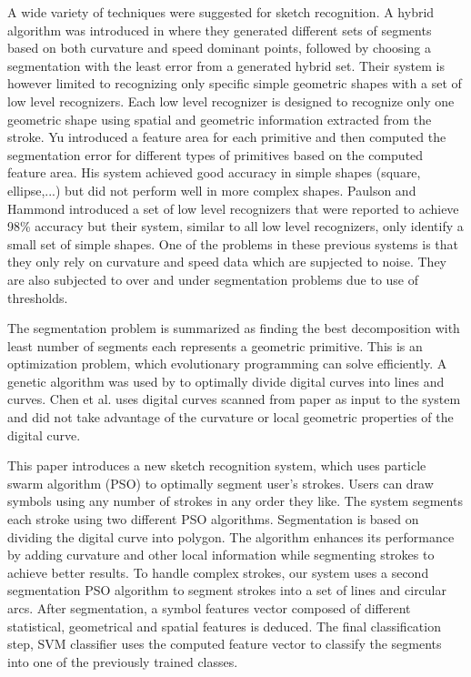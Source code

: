 \documentclass{article}
\begin{document}
A wide variety of techniques were suggested for sketch recognition.  A hybrid algorithm was introduced in \cite{earlyprocess} where they generated different sets of segments based on both curvature and speed dominant points, followed by choosing a segmentation with the least error from a generated hybrid set. Their system is however limited to recognizing only specific simple geometric shapes with a set of low level recognizers. Each low level recognizer is designed to recognize only one geometric shape using spatial and geometric information extracted from the stroke.  Yu \cite{meanshift10} introduced a feature area for each primitive and then computed the segmentation error for different types of primitives based on the computed feature area. His system achieved good accuracy in simple shapes (square, ellipse,...) but did not perform well in more complex shapes. Paulson and Hammond\cite{Paleosketch08} introduced a set of low level recognizers that were reported to achieve 98\%  accuracy but their system, similar to all low level recognizers, only identify a small set of simple shapes. One of the problems in these previous systems is that they only rely on curvature and speed data which are supjected to noise. They are also subjected to over and under segmentation problems due to use of thresholds. 

The segmentation problem is summarized as finding the best decomposition with least number of segments each represents a geometric primitive. This is an optimization problem, which evolutionary programming can solve efficiently. A genetic algorithm was used by \cite{CruveDivisionSwarm} to optimally divide digital curves into lines and curves. Chen et al.\cite{CruveDivisionSwarm} uses digital curves scanned from paper as input to the system and did not take advantage of the curvature or local geometric properties of the digital curve.

This paper introduces a new sketch recognition system, which uses particle swarm algorithm (PSO) to optimally segment user's strokes. Users can draw symbols using any number of strokes in any order they like. The system segments each stroke using two different PSO algorithms. Segmentation is based on dividing the digital curve into polygon\cite{PolygonApproximationPSO}. The algorithm enhances its performance by adding curvature and other local information while segmenting strokes to achieve better results. To handle complex strokes, our system uses a second segmentation PSO algorithm to segment strokes into a set of lines and circular arcs. After segmentation, a symbol features vector composed of different statistical, geometrical and spatial features is deduced. The final classification step, SVM classifier uses the computed feature vector to classify the segments into one of the previously trained classes. 
\end{document}

